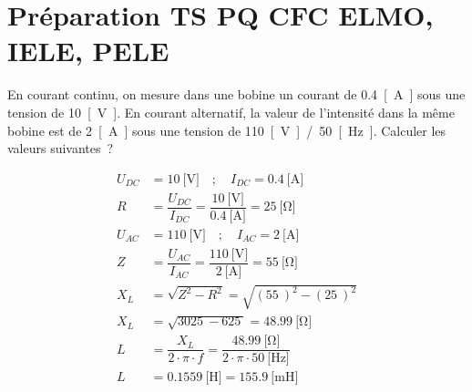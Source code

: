 \documentclass[a4paper,11pt,answers,addpoints]{exam}
\begin{document}
\unframedsolutions
\pointsinmargin
\bracketedpoints
\section*{Préparation TS PQ CFC ELMO, IELE, PELE}
\begin{questions}

\question En courant continu, on mesure dans une bobine un courant de \qty{0,4}{[\ampere]} sous une tension de \qty{10}{[\volt]}. En courant alternatif, la valeur de l'intensité dans la même bobine est de \qty{2}{[\ampere]} sous une tension de \qty{110}{[\volt]}~/~\qty{50}{[\hertz]}. Calculer les valeurs suivantes~?

\vspace{0.5em}
\begin{solution}
	\begin{align*}
		U_{DC} &= \qty{10}{[\volt]} \quad ; \quad I_{DC} = \qty{0,4}{[\ampere]} \\[6pt]
		R &= \dfrac{U_{DC}}{I_{DC}} = \dfrac{\qty{10}{[\volt]}}{\qty{0,4}{[\ampere]}} = \qty{25}{[\ohm]} \\[6pt]
		U_{AC} &= \qty{110}{[\volt]} \quad ; \quad I_{AC} = \qty{2}{[\ampere]} \\[6pt]
		Z &= \dfrac{U_{AC}}{I_{AC}} = \dfrac{\qty{110}{[\volt]}}{\qty{2}{[\ampere]}} = \qty{55}{[\ohm]} \\[6pt]
		X_L &= \sqrt{Z^2 - R^2} = \sqrt{(\qty{55}{})^2 - (\qty{25}{})^2} \\[6pt]
		X_L &= \sqrt{\qty{3025}{} - \qty{625}{}} = \qty{48,99}{[\ohm]} \\[6pt]
		L &= \dfrac{X_L}{2 \cdot \pi \cdot f} = \dfrac{\qty{48,99}{[\ohm]}}{2 \cdot \pi \cdot \qty{50}{[\hertz]}} \\[6pt]
		L &= \qty{0,1559}{[\henry]} = \qty{155,9}{[\milli\henry]} \\[6pt]
	\end{align*}
	

\end{solution}
\end{questions}
\end{document}

